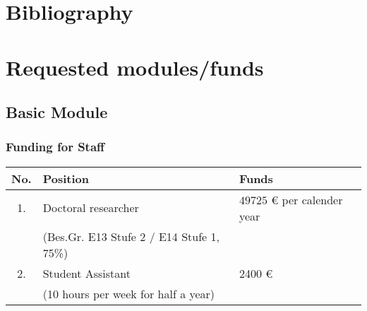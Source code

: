 \documentclass[a4paper,12pt]{article}
\begin{document}



\newpage
\section{Bibliography}

\vspace{-1.25cm}

\renewcommand\refname{}

{\small
\setlength{\bibsep}{0.55em}
}



\section{Requested modules/funds}


\subsection{Basic Module}


\subsubsection{Funding for Staff}

\begin{center}
\begin{tabular}{c l l}
No. & Position & Funds \\
\hline 
1.  & Doctoral researcher & $49 725$ \euro{} per calender year \\
    & (Bes.Gr. E13 Stufe 2 / E14 Stufe 1, 75\%) & \\
2.  & Student Assistant & 2400 \euro{} \\  %
    & (10 hours per week for half a year) & \\[0.1cm]    
\end{tabular}
\end{center}
\end{document}
